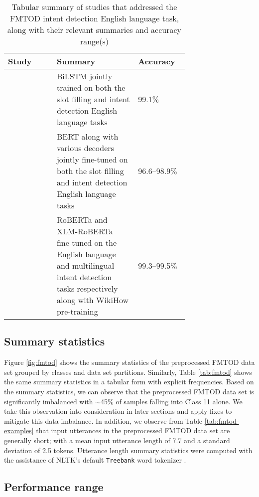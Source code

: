 \begin{table}[t!]
  \centering {}
  \begin{tabular}{L{0.27\linewidth} L{0.45\linewidth} l}
    \toprule
    Study & Summary & Accuracy \\
    \midrule
    \citet{schuster-etal-2019-cross-lingual} & BiLSTM jointly trained on both the slot filling and intent detection English language tasks & 99.1$\%$ \\
    \citet{zhang2019joint} & BERT along with various decoders jointly fine-tuned on both the slot filling and intent detection English language tasks & 96.6--98.9$\%$ \\
    \citet{zhang-etal-2020-intent} & RoBERTa and XLM-RoBERTa fine-tuned on the English language and multilingual intent detection tasks respectively along with WikiHow pre-training & 99.3--99.5$\%$ \\
    \bottomrule
  \end{tabular}
  \caption{Tabular summary of studies that addressed the FMTOD intent detection
    English language task, along with their relevant summaries and accuracy
    range(s)}
  \label{tab:fmtod-results}
\end{table}

\subsection{Summary statistics}

Figure \ref{fig:fmtod} shows the summary statistics of the preprocessed FMTOD
data set grouped by classes and data set partitions. Similarly, Table
\ref{tab:fmtod} shows the same summary statistics in a tabular form with
explicit frequencies. Based on the summary statistics, we can observe that the
preprocessed FMTOD data set is significantly imbalanced with $\sim$45$\%$ of
samples falling into Class 11 alone. We take this observation into consideration
in later sections and apply fixes to mitigate this data imbalance. In addition,
we observe from Table \ref{tab:fmtod-examples} that input utterances in the
preprocessed FMTOD data set are generally short; with a mean input utterance
length of 7.7 and a standard deviation of 2.5 tokens. Utterance length summary
statistics were computed with the assistance of NLTK's default \texttt{Treebank}
word tokenizer \citep{bird-loper-2004-nltk}.

\subsection{Performance range}

